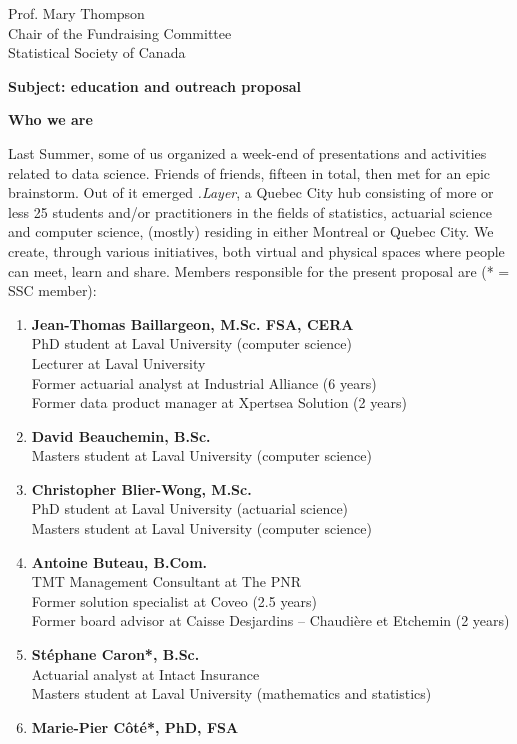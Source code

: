 \documentclass[11pt, a4paper]{letter} %
\begin{document}
\begin{letter}{
	Prof. Mary Thompson\\
	Chair of the Fundraising Committee\\
	Statistical Society of Canada
	
	\bigskip
	\textbf{Subject: education and outreach proposal}%
}
\bigskip
\noindent \textbf{Who we are}

Last Summer, some of us organized a week-end of presentations and activities related to data science. Friends of friends, fifteen in total, then met for an epic brainstorm. Out of it emerged \emph{.Layer}, a Quebec City hub consisting of more or less 25 students and/or practitioners in the fields of statistics, actuarial science and computer science, (mostly) residing in either Montreal or Quebec City. We create, through various initiatives, both virtual and physical spaces where people can meet, learn and share. Members responsible for the present proposal are (* = SSC member):
\begin{enumerate}
	\item[] \textbf{Jean-Thomas Baillargeon, M.Sc. FSA, CERA}\\
	\quad PhD student at Laval University (computer science)\\
	\quad Lecturer at Laval University\\
	\quad Former actuarial analyst at Industrial Alliance (6 years)\\
	\quad Former data product manager at Xpertsea Solution (2 years)
	\item[] \textbf{David Beauchemin, B.Sc.}\\
	\quad Masters student at Laval University (computer science)
	\item[] \textbf{Christopher Blier-Wong, M.Sc.}\\
	\quad PhD student at Laval University (actuarial science)\\
	\quad Masters student at Laval University (computer science)
	\item[] \textbf{Antoine Buteau, B.Com.}\\
	\quad TMT Management Consultant at The PNR\\
	\quad Former solution specialist at Coveo (2.5 years)\\
	\quad Former board advisor at Caisse Desjardins -- Chaudière et Etchemin (2 years)
	\item[] \textbf{Stéphane Caron*, B.Sc.}\\
	\quad Actuarial analyst at Intact Insurance\\
	\quad Masters student at Laval University (mathematics and statistics)
	\item[] \textbf{Marie-Pier Côté*, PhD, FSA}\\

\end{enumerate}
\end{letter}
\end{document}
